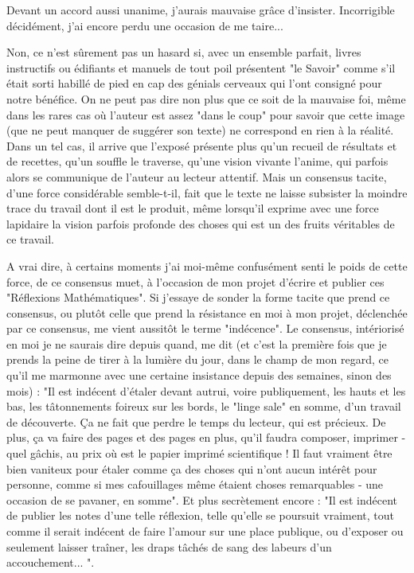 Devant un accord aussi unanime, j'aurais mauvaise grâce d'insister. Incorrigible décidément, j'ai encore perdu une occasion de me taire...

Non, ce n'est sûrement pas un hasard si, avec un ensemble parfait, livres instructifs ou édifiants et manuels de tout poil présentent "le Savoir" comme s'il était sorti habillé de pied en cap des génials cerveaux qui l'ont consigné pour notre bénéfice. On ne peut pas dire non plus que ce soit de la mauvaise foi, même dans les rares cas où l'auteur est assez "dans le coup" pour savoir que cette image (que ne peut manquer de suggérer son texte) ne correspond en rien à la réalité. Dans un tel cas, il arrive que l'exposé présente plus qu'un recueil de résultats et de recettes, qu'un souffle le traverse, qu'une vision vivante l'anime, qui parfois alors se communique de l'auteur au lecteur attentif. Mais un consensus tacite, d'une force considérable semble-t-il, fait que le texte ne laisse subsister la moindre trace du travail dont il est le produit, même lorsqu'il exprime avec une force lapidaire la vision parfois profonde des choses qui est un des fruits véritables de ce travail.

A vrai dire, à certains moments j'ai moi-même confusément senti le poids de cette force, de ce consensus muet, à l'occasion de mon projet d'écrire et publier ces "Réflexions Mathématiques". Si j'essaye de sonder la forme tacite que prend ce consensus, ou plutôt celle que prend la résistance en moi à mon projet, déclenchée par ce consensus, me vient aussitôt le terme "indécence". Le consensus, intériorisé en moi je ne saurais dire depuis quand, me dit (et c'est la première fois que je prends la peine de tirer à la lumière du jour, dans le champ de mon regard, ce qu'il me marmonne avec une certaine insistance depuis des semaines, sinon des mois) : "Il est indécent d'étaler devant autrui, voire publiquement, les hauts et les bas, les tâtonnements foireux sur les bords, le "linge sale" en somme, d'un travail de découverte. Ça ne fait que perdre le temps du lecteur, qui est précieux. De plus, ça va faire des pages et des pages en plus, qu'il faudra composer, imprimer - quel gâchis, au prix où est le papier imprimé scientifique ! Il faut vraiment être bien vaniteux pour étaler comme ça des choses qui n'ont aucun intérêt pour personne, comme si mes cafouillages même étaient choses remarquables - une occasion de se pavaner, en somme". Et plus secrètement encore : "Il est indécent de publier les notes d'une telle réflexion, telle qu'elle se poursuit vraiment, tout comme il serait indécent de faire l'amour sur une place publique, ou d'exposer ou seulement laisser traîner, les draps tâchés de sang des labeurs d'un accouchement... ".


